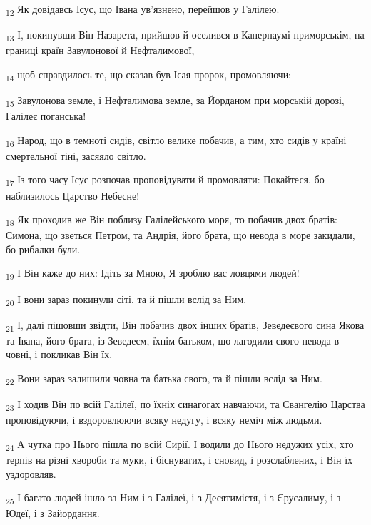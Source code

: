 \begin{tcolorbox}
\textsubscript{12} Як довідавсь Ісус, що Івана ув'язнено, перейшов у Галілею.
\end{tcolorbox}
\begin{tcolorbox}
\textsubscript{13} І, покинувши Він Назарета, прийшов й оселився в Капернаумі приморськім, на границі країн Завулонової й Нефталимової,
\end{tcolorbox}
\begin{tcolorbox}
\textsubscript{14} щоб справдилось те, що сказав був Ісая пророк, промовляючи:
\end{tcolorbox}
\begin{tcolorbox}
\textsubscript{15} Завулонова земле, і Нефталимова земле, за Йорданом при морській дорозі, Галілеє поганська!
\end{tcolorbox}
\begin{tcolorbox}
\textsubscript{16} Народ, що в темноті сидів, світло велике побачив, а тим, хто сидів у країні смертельної тіні, засяяло світло.
\end{tcolorbox}
\begin{tcolorbox}
\textsubscript{17} Із того часу Ісус розпочав проповідувати й промовляти: Покайтеся, бо наблизилось Царство Небесне!
\end{tcolorbox}
\begin{tcolorbox}
\textsubscript{18} Як проходив же Він поблизу Галілейського моря, то побачив двох братів: Симона, що зветься Петром, та Андрія, його брата, що невода в море закидали, бо рибалки були.
\end{tcolorbox}
\begin{tcolorbox}
\textsubscript{19} І Він каже до них: Ідіть за Мною, Я зроблю вас ловцями людей!
\end{tcolorbox}
\begin{tcolorbox}
\textsubscript{20} І вони зараз покинули сіті, та й пішли вслід за Ним.
\end{tcolorbox}
\begin{tcolorbox}
\textsubscript{21} І, далі пішовши звідти, Він побачив двох інших братів, Зеведеєвого сина Якова та Івана, його брата, із Зеведеєм, їхнім батьком, що лагодили свого невода в човні, і покликав Він їх.
\end{tcolorbox}
\begin{tcolorbox}
\textsubscript{22} Вони зараз залишили човна та батька свого, та й пішли вслід за Ним.
\end{tcolorbox}
\begin{tcolorbox}
\textsubscript{23} І ходив Він по всій Галілеї, по їхніх синагогах навчаючи, та Євангелію Царства проповідуючи, і вздоровлюючи всяку недугу, і всяку неміч між людьми.
\end{tcolorbox}
\begin{tcolorbox}
\textsubscript{24} А чутка про Нього пішла по всій Сирії. І водили до Нього недужих усіх, хто терпів на різні хвороби та муки, і біснуватих, і сновид, і розслаблених, і Він їх уздоровляв.
\end{tcolorbox}
\begin{tcolorbox}
\textsubscript{25} І багато людей ішло за Ним і з Галілеї, і з Десятимістя, і з Єрусалиму, і з Юдеї, і з Зайордання.
\end{tcolorbox}
